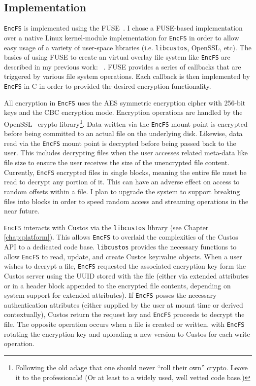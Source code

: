 \subsection{Implementation}

\texttt{EncFS} is implemented using the FUSE~\cite{fuse}. I chose a
FUSE-based implementation over a native Linux kernel-module
implementation for \texttt{EncFS} in order to allow easy usage of a
variety of user-space libraries (i.e. \texttt{libcustos}, OpenSSL,
etc). The basics of using FUSE to create an virtual overlay file
system like \texttt{EncFS} are described in my previous work:
~\cite{sayler-os-encfs}. FUSE provides a series of callbacks that are
triggered by various file system operations. Each callback is then
implemented by \texttt{EncFS} in C in order to provided the desired
encryption functionality.

All encryption in \texttt{EncFS} uses the AES symmetric encryption
cipher with 256-bit keys and the CBC encryption mode. Encryption
operations are handled by the OpenSSL~\cite{openssl} crypto
library\footnote{Following the old adage that one should never ``roll
  their own'' crypto. Leave it to the professionals! (Or at least to a
  widely used, well vetted code base.)}. Data written via the
\texttt{EncFS} mount point is encrypted before being committed to an
actual file on the underlying disk. Likewise, data read via the
\texttt{EncFS} mount point is decrypted before being passed back to
the user. This includes decrypting files when the user accesses
related meta-data like file size to ensure the user receives the size
of the unencrypted file content. Currently, \texttt{EncFS} encrypted
files in single blocks, meaning the entire file must be read to
decrypt any portion of it. This can have an adverse effect on access
to random offsets within a file. I plan to upgrade the system to
support breaking files into blocks in order to speed random access and
streaming operations in the near future.

\texttt{EncFS} interacts with Custos via the \texttt{libcustos}
library (see Chapter \ref{chap:platform}). This allows \texttt{EncFS}
to overlaid the complexities of the Custos API to a dedicated code
base. \texttt{libcustos} provides the necessary functions to allow
\texttt{EncFS} to read, update, and create Custos key:value
objects. When a user wishes to decrypt a file, \texttt{EncFS}
requested the associated encryption key form the Custos server using
the UUID stored with the file (either via extended attributes or in a
header block appended to the encrypted file contents, depending on
system support for extended attributes). If \texttt{EncFS} posses the
necessary authentication attributes (either supplied by the user at
mount time or derived contextually), Custos return the request key and
\texttt{EncFS} proceeds to decrypt the file. The opposite operation
occurs when a file is created or written, with \texttt{EncFS} rotating
the encryption key and uploading a new version to Custos for each
write operation.

